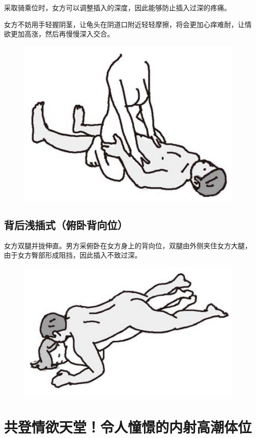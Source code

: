 \documentclass[12pt,UTF8]{ctexbook}
\begin{document}
采取骑乘位时，女方可以调整插入的深度，因此能够防止插入过深的疼痛。

女方不妨用手轻握阴茎，让龟头在阴道口附近轻轻摩擦，将会更加心痒难耐，让情欲更加高涨，然后再慢慢深入交合。

\begin{figure}[htbp]
\centering
\includegraphics[width=0.7\linewidth]{tw21}
\caption{}
\label{fig:1}
\end{figure}

\subsection{背后浅插式（俯卧背向位）}

女方双腿并拢伸直。男方采俯卧在女方身上的背向位，双腿由外侧夹住女方大腿，由于女方臀部形成阻挡，因此插入不致过深。

\begin{figure}[htbp]
\centering
\includegraphics[width=0.7\linewidth]{tw22}
\caption{}
\label{fig:1}
\end{figure}

\section{共登情欲天堂！令人憧憬的内射高潮体位}
\end{document}
